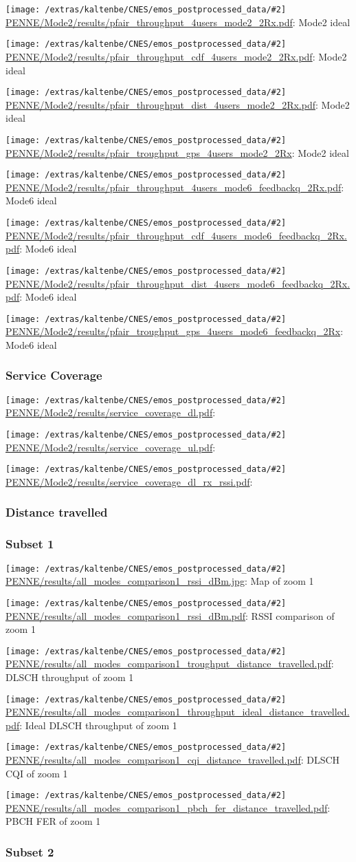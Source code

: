 \documentclass[a4paper,10pt]{article}
\newcommand{\printfile}[2][]{
 \begin{minipage}{8cm}
  \centering
  \texttt{[image: /extras/kaltenbe/CNES/emos\_postprocessed\_data/\#2]}
  \url{#2}: #1

 \end{minipage}
}
\begin{document}
\printfile[Mode2 ideal]{PENNE/Mode2/results/pfair_throughput_4users_mode2_2Rx.pdf}
\printfile[Mode2 ideal]{PENNE/Mode2/results/pfair_throughput_cdf_4users_mode2_2Rx.pdf}

\printfile[Mode2 ideal]{PENNE/Mode2/results/pfair_throughput_dist_4users_mode2_2Rx.pdf}
\printfile[Mode2 ideal]{PENNE/Mode2/results/pfair_troughput_gps_4users_mode2_2Rx}

\printfile[Mode6 ideal]{PENNE/Mode2/results/pfair_throughput_4users_mode6_feedbackq_2Rx.pdf}
\printfile[Mode6 ideal]{PENNE/Mode2/results/pfair_throughput_cdf_4users_mode6_feedbackq_2Rx.pdf}

\printfile[Mode6 ideal]{PENNE/Mode2/results/pfair_throughput_dist_4users_mode6_feedbackq_2Rx.pdf}
\printfile[Mode6 ideal]{PENNE/Mode2/results/pfair_troughput_gps_4users_mode6_feedbackq_2Rx}


\subsubsection{Service Coverage}

\printfile{PENNE/Mode2/results/service_coverage_dl.pdf}
\printfile{PENNE/Mode2/results/service_coverage_ul.pdf}

\printfile{PENNE/Mode2/results/service_coverage_dl_rx_rssi.pdf}

\subsubsection{Distance travelled}
\label{sec:dist_travelled_penne}

\subsubsection*{Subset 1}

\printfile[Map of zoom 1]{PENNE/results/all_modes_comparison1_rssi_dBm.jpg}
\printfile[RSSI comparison of zoom 1]{PENNE/results/all_modes_comparison1_rssi_dBm.pdf}

\printfile[DLSCH throughput of zoom 1]{PENNE/results/all_modes_comparison1_troughput_distance_travelled.pdf}
\printfile[Ideal DLSCH throughput of zoom 1]{PENNE/results/all_modes_comparison1_throughput_ideal_distance_travelled.pdf}

\printfile[DLSCH CQI of zoom 1]{PENNE/results/all_modes_comparison1_cqi_distance_travelled.pdf}
\printfile[PBCH FER of zoom 1]{PENNE/results/all_modes_comparison1_pbch_fer_distance_travelled.pdf}

\subsubsection*{Subset 2}
\end{document}
